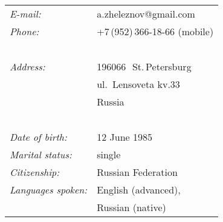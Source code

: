 \documentclass[a4paper,oneside,12pt]{article}
\begin{document}
\begin{centering}
\begin{minipage}{0.70\linewidth}%
\vspace{-1.5em}{\Huge\bfseries Alexander Zheleznov}

~\\[-1.5em]

\hspace{1.9em}\begin{tabularx}{\linewidth}{ll}
{\it E-mail:}		& a.zheleznov@gmail.com\\
{\it Phone:}	        & +7\,(952)\,366-18-66 (mobile)\\
~\\[-1.0em] 
{\it Address:}	    & 196066\,~St.\,Petersburg\\
                    & ul.~Lensoveta kv.33\\
                    & Russia\\

~\\[-1.0em]
{\it Date of birth:}	& 12 June 1985\\
{\it Marital status:}& single\\
{\it Citizenship:}   & Russian Federation\\
{\it Languages spoken:}& English (advanced),\\ 
		       &Russian (native)\\
\end{tabularx}
\end{minipage}
\begin{minipage}{0.23\linewidth}%
\begin{flushright}
{%
\setlength{\fboxsep}{0pt}%
\setlength{\fboxrule}{0pt}%
\fbox{
}
}%
\end{flushright}
\end{minipage}
\end{centering}
~\\[1.5em]
\end{document}
